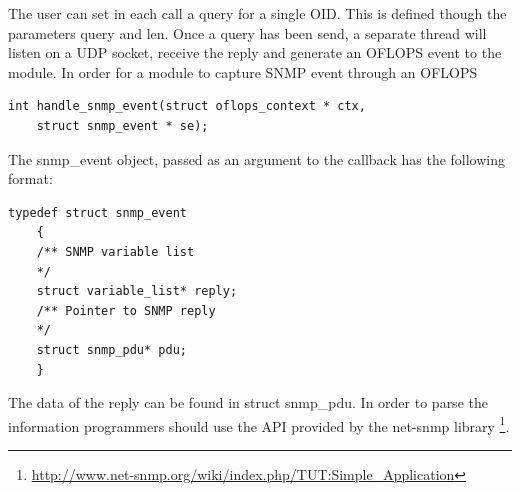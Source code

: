 \documentclass{book}
\begin{document}
The user can set in each call a query for a single OID. This is defined though the parameters query and len. Once
a query has been send, a separate thread will listen on a UDP socket, receive the reply and generate an OFLOPS 
event to the module. In order for a module to capture SNMP event through an OFLOPS 

\begin{lstlisting}[caption={SNMP reply event callback}]
    int handle_snmp_event(struct oflops_context * ctx, 
    struct snmp_event * se);
\end{lstlisting}

The snmp\_event object, passed as an argument to the callback has the following format:

\begin{lstlisting}[caption={SNMP event structure}]
    typedef struct snmp_event
    {
    /** SNMP variable list
    */
    struct variable_list* reply;
    /** Pointer to SNMP reply
    */
    struct snmp_pdu* pdu;
    }
\end{lstlisting}

The data of the reply can be found in struct snmp\_pdu. In order to parse the information programmers should use
the API provided by the net-snmp library \footnote{\url{http://www.net-snmp.org/wiki/index.php/TUT:Simple_Application}}. 
\end{document}

